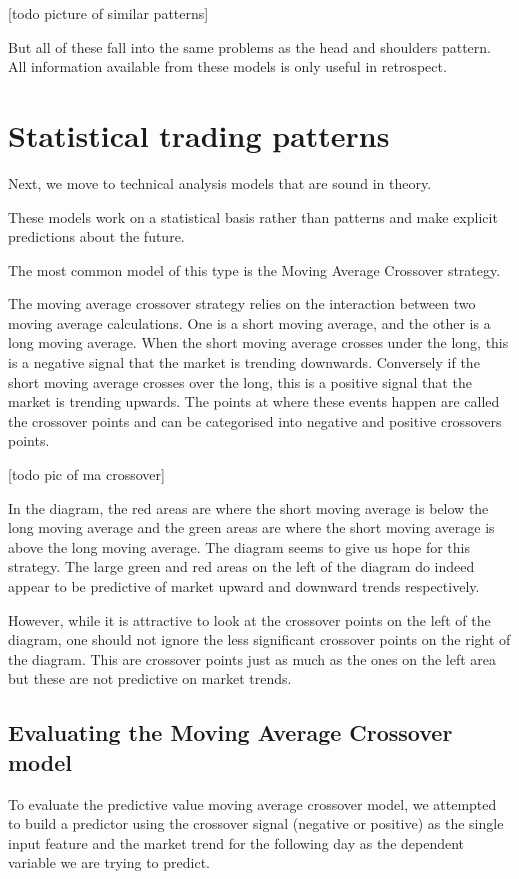 \documentclass{report}
\begin{document}
[todo picture of similar patterns]

But all of these fall into the same problems as the head and shoulders pattern. All information available from these models is only useful in retrospect. 

\section{Statistical trading patterns}

Next, we move to technical analysis models that are sound in theory. 

These models work on a statistical basis rather than patterns and make explicit predictions about the future.

The most common model of this type is the Moving Average Crossover strategy.

The moving average crossover strategy relies on the interaction between two moving average calculations. One is a short moving average, and the other is a long moving average. When the short moving average crosses under the long, this is a negative signal that the market is trending downwards. Conversely if the short moving average crosses over the long, this is a positive signal that the market is trending upwards. The points at where these events happen are called the crossover points and can be categorised into negative and positive crossovers points.

[todo pic of ma crossover]

In the diagram, the red areas are where the short moving average is below the long moving average and the green areas are where the short moving average is above the long moving average. The diagram seems to give us hope for this strategy. The large green and red areas on the left of the diagram do indeed appear to be predictive of market upward and downward trends respectively. 

However, while it is attractive to look at the crossover points on the left of the diagram, one should not ignore the less significant crossover points on the right of the diagram. This are crossover points just as much as the ones on the left area but these are not predictive on market trends.

\subsection{Evaluating the Moving Average Crossover model}

To evaluate the predictive value moving average crossover model, we attempted to build a predictor using the crossover signal (negative or positive) as the single input feature and the market trend for the following day as the dependent variable we are trying to predict. 
\end{document}
